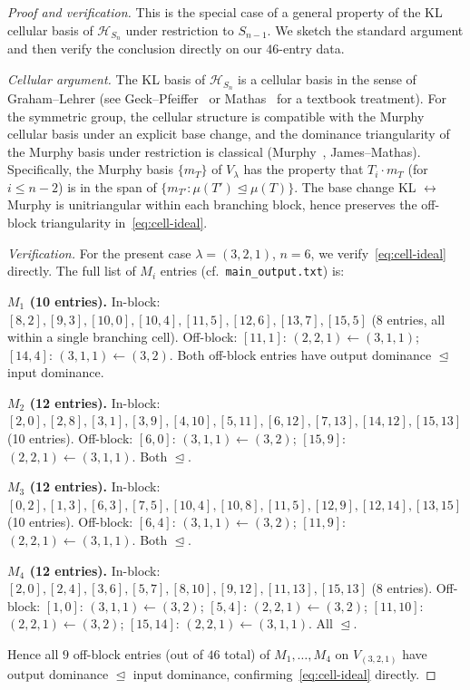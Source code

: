 \documentclass[11pt]{article}
\theoremstyle{definition}
\begin{document}
\begin{proof}[Proof and verification]
This is the special case of a general property of the KL cellular basis of $\mathcal H_{S_n}$ under restriction to $S_{n-1}$. We sketch the standard argument and then verify the conclusion directly on our $46$-entry data.

\emph{Cellular argument.} The KL basis of $\mathcal H_{S_n}$ is a cellular basis in the sense of Graham--Lehrer (see Geck--Pfeiffer~\cite[Ch.~5]{GeckPfeiffer} or Mathas~\cite[Ch.~3]{Mathas} for a textbook treatment). For the symmetric group, the cellular structure is compatible with the Murphy cellular basis under an explicit base change, and the dominance triangularity of the Murphy basis under restriction is classical (Murphy~\cite{MurphyCellular}, James--Mathas). Specifically, the Murphy basis $\{m_T\}$ of $V_\lambda$ has the property that $T_i \cdot m_T$ (for $i \leq n-2$) is in the span of $\{m_{T'} : \mu(T') \trianglelefteq \mu(T)\}$. The base change KL $\leftrightarrow$ Murphy is unitriangular within each branching block, hence preserves the off-block triangularity in~\eqref{eq:cell-ideal}.

\emph{Verification.} For the present case $\lambda = (3,2,1)$, $n = 6$, we verify~\eqref{eq:cell-ideal} directly. The full list of $M_i$ entries (cf.\ \texttt{main\_output.txt}) is:

\medskip
\noindent\textbf{$M_1$ (10 entries).} In-block: $[8,2], [9,3], [10,0], [10,4], [11,5], [12,6], [13,7], [15,5]$ (8 entries, all within a single branching cell). Off-block: $[11,1]$: $(2,2,1) \leftarrow (3,1,1)$; $[14,4]$: $(3,1,1) \leftarrow (3,2)$. Both off-block entries have output dominance $\trianglelefteq$ input dominance. \checkmark

\medskip
\noindent\textbf{$M_2$ (12 entries).} In-block: $[2,0], [2,8], [3,1], [3,9], [4,10], [5,11], [6,12], [7,13], [14,12], [15,13]$ (10 entries). Off-block: $[6,0]$: $(3,1,1) \leftarrow (3,2)$; $[15,9]$: $(2,2,1) \leftarrow (3,1,1)$. Both $\trianglelefteq$. \checkmark

\medskip
\noindent\textbf{$M_3$ (12 entries).} In-block: $[0,2], [1,3], [6,3], [7,5], [10,4], [10,8], [11,5], [12,9], [12,14], [13,15]$ (10 entries). Off-block: $[6,4]$: $(3,1,1) \leftarrow (3,2)$; $[11,9]$: $(2,2,1) \leftarrow (3,1,1)$. Both $\trianglelefteq$. \checkmark

\medskip
\noindent\textbf{$M_4$ (12 entries).} In-block: $[2,0], [2,4], [3,6], [5,7], [8,10], [9,12], [11,13], [15,13]$ (8 entries). Off-block: $[1,0]$: $(3,1,1) \leftarrow (3,2)$; $[5,4]$: $(2,2,1) \leftarrow (3,2)$; $[11,10]$: $(2,2,1) \leftarrow (3,2)$; $[15,14]$: $(2,2,1) \leftarrow (3,1,1)$. All $\trianglelefteq$. \checkmark

\medskip
Hence all $9$ off-block entries (out of $46$ total) of $M_1, \ldots, M_4$ on $V_{(3,2,1)}$ have output dominance $\trianglelefteq$ input dominance, confirming~\eqref{eq:cell-ideal} directly. \qedhere
\end{proof}
\end{document}
